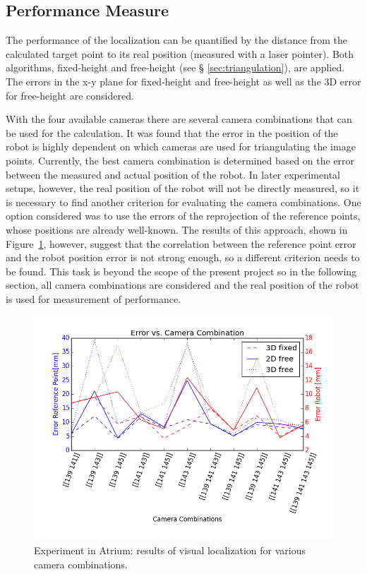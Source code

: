
\subsection{Performance Measure}
The performance of the localization can be quantified by the distance from the calculated target point to its real position (measured with a laser pointer). 
Both algorithms, fixed-height and free-height (see § \ref{sec:triangulation}), are applied. The errors in the x-y plane for fixed-height and free-height as well as the 3D error for free-height are considered. 

With the four available cameras there are several camera combinations that can be used for the calculation.
It was found that the error in the position of the robot is highly dependent on which cameras are used for triangulating the image points. 
Currently, the best camera combination is determined based on the error between the measured and actual position of the robot.
In later experimental setups, however, the real position of the robot will not be directly measured, so it is necessary to find another criterion for evaluating the camera combinations.
One option considered was to use the errors of the reprojection of the reference points, whose positions are already well-known.
The results of this approach, shown in Figure~\ref{fig:res0_err}, however, suggest that the correlation between the reference point error and the robot position error is not strong enough, so a different criterion needs to be found.
This task is beyond the scope of the present project so in the following section, all camera combinations are considered and the real position of the robot is used for measurement of performance.


\begin{figure}[H]
    \centering
    \includegraphics[width=.8\linewidth]{files/res0_combi_4.png}
    \caption{Experiment in Atrium: results of visual localization for various camera combinations.}
    \label{fig:res0_err}
\end{figure}
